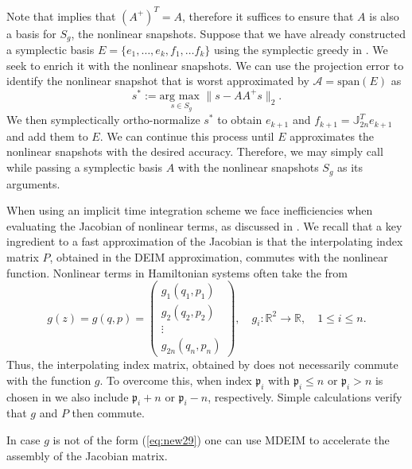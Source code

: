 Note that  implies that $(A^+)^T=A$, therefore it suffices to ensure that $A$ is also a basis for $S_g$, the nonlinear snapshots. Suppose that we have already constructed a symplectic basis $E =\{ e_1,\dots , e_k,f_1,\dots f_k \}$ using the symplectic greedy in . We seek to enrich it with the nonlinear snapshots. We can use the projection error to identify the nonlinear snapshot that is worst approximated by $\mathcal A = \text{span}(E)$ as
\begin{equation}
	s^* := \underset{s \in S_{ g}}{\text{arg\ max }}\| s - AA^+ s \|_2.	
\end{equation}
We then symplectically ortho-normalize $s^*$ to obtain $e_{k+1}$ and $f_{k+1} = \mathbb J_{2n}^T e_{k+1}$ and add them to $E$. We can continue this process until $E$ approximates the nonlinear snapshots with the desired accuracy. Therefore, we may simply call  while passing a symplectic basis $A$ with the nonlinear snapshots $S_g$ as its arguments.

When using an implicit time integration scheme we face inefficiencies when evaluating the Jacobian of nonlinear terms, as discussed in . We recall that a key ingredient to a fast approximation of the Jacobian is that the interpolating index matrix $P$, obtained in the DEIM approximation, commutes with the nonlinear function. Nonlinear terms in Hamiltonian systems often take the from
\begin{equation} \label{eq:new29}
	g (z) = g (q,p) = 
	\begin{pmatrix}
		g_1(q_1,p_1) \\
		g_2(q_2,p_2) \\
		\vdots \\
		g_{2n}(q_{n},p_{n})
	\end{pmatrix}, \quad g_{i}:\mathbb R^{2}\to \mathbb R, \quad 1\leq i \leq n.
\end{equation}
Thus, the interpolating index matrix, obtained by  does not necessarily commute with the function $g$. To overcome this, when index $\mathfrak p_i$ with $\mathfrak p_i\leq n$ or $\mathfrak p_i>n$ is chosen in  we also include $\mathfrak p_i + n$ or $\mathfrak p_i-n$, respectively. Simple calculations verify that $g$ and $P$ then commute.

In case $g$ is not of the form (\ref{eq:new29}) one can use MDEIM \cite{carlberg2012efficient,negri2015efficient} to accelerate the assembly of the Jacobian matrix.




